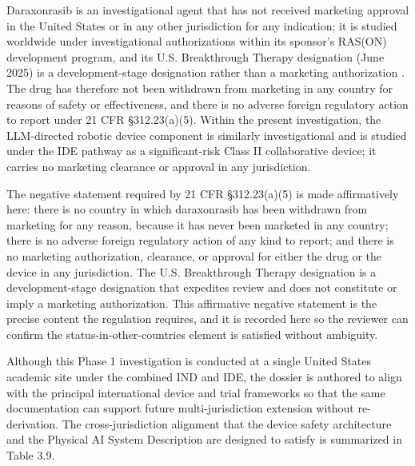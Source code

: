 Daraxonrasib is an investigational agent that has not received marketing approval
in the United States or in any other jurisdiction for any indication; it is studied
worldwide under investigational authorizations within its sponsor's RAS(ON)
development program, and its U.S. Breakthrough Therapy designation (June 2025) is a
development-stage designation rather than a marketing authorization
\cite{daraxwhipple, onpremwhippl}. The drug has therefore not been withdrawn from
marketing in any country for reasons of safety or effectiveness, and there is no
adverse foreign regulatory action to report under 21 CFR \S 312.23(a)(5). Within the
present investigation, the LLM-directed robotic device component is similarly
investigational and is studied under the IDE pathway as a significant-risk Class II
collaborative device; it carries no marketing clearance or approval in any
jurisdiction.

The negative statement required by 21 CFR \S 312.23(a)(5) is made affirmatively
here: there is no country in which daraxonrasib has been withdrawn from marketing for
any reason, because it has never been marketed in any country; there is no adverse
foreign regulatory action of any kind to report; and there is no marketing
authorization, clearance, or approval for either the drug or the device in any
jurisdiction. The U.S. Breakthrough Therapy designation is a development-stage
designation that expedites review and does not constitute or imply a marketing
authorization. This affirmative negative statement is the precise content the
regulation requires, and it is recorded here so the reviewer can confirm the
status-in-other-countries element is satisfied without ambiguity.

Although this Phase 1 investigation is conducted at a single United States academic
site under the combined IND and IDE, the dossier is authored to align with the
principal international device and trial frameworks so that the same documentation
can support future multi-jurisdiction extension without re-derivation. The
cross-jurisdiction alignment that the device safety architecture and the
Physical AI System Description are designed to satisfy is summarized in Table 3.9. 

\clearpage

